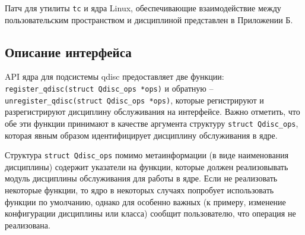 	Патч для утилиты \texttt{tc} и ядра Linux, обеспечивающие взаимодействие между
	пользовательским пространством и дисциплиной представлен в Приложении Б. 

	\subsection{Описание интерфейса}

	API ядра для подсистемы qdisc предоставляет две функции: \lstinline{register_qdisc(struct Qdisc_ops *ops)}
	и обратную -- \lstinline{unregister_qdisc(struct Qdisc_ops *ops)}, которые регистрируют
	и разрегистрируют дисциплину обслуживания на интерфейсе. Важно отметить, что обе эти
	функции принимают в качестве аргумента структуру \lstinline{struct Qdisc_ops},
	которая явным образом идентифицирует дисциплину обслуживания в ядре.

	Структура \lstinline{struct Qdisc_ops} помимо метаинформации (в виде наименования дисциплины)
	содержит указатели на функции, которые должен реализовывать модуль дисциплины обслуживания
	для работы в ядре. Если не реализовать некоторые функции,
	то ядро в некоторых случаях попробует использовать функции по умолчанию, однако
	для особенно важных (к примеру, изменение конфигурации дисциплины или класса)
	сообщит пользователю, что операция не реализована.

